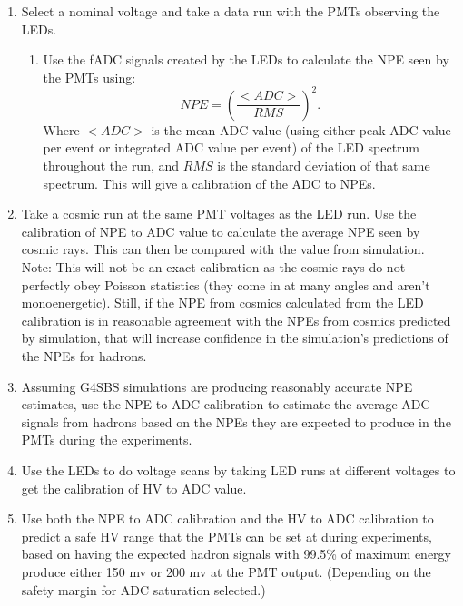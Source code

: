 \documentclass[10pt]{article}
\begin{document}
\begin{enumerate}
	\item Select a nominal voltage and take a data run with the PMTs observing the LEDs.
		\begin{enumerate}
			\item Use the fADC signals created by the LEDs to calculate the NPE seen by the PMTs using:
			\begin{equation}
				NPE = \left( \frac{<ADC>}{RMS} \right)^2.
			\end{equation}
			Where $<ADC>$ is the mean ADC value (using either peak ADC value per event or integrated ADC value per event) of the LED spectrum throughout the run, and $RMS$ is the standard deviation of that same spectrum. This will give a calibration of the ADC to NPEs.
		\end{enumerate}
		\item Take a cosmic run at the same PMT voltages as the LED run. Use the calibration of NPE to ADC value to calculate the average NPE seen by cosmic rays. This can then be compared with the value from simulation. Note: This will not be an exact calibration as the cosmic rays do not perfectly obey Poisson statistics (they come in at many angles and aren't monoenergetic). Still, if the NPE from cosmics calculated from the LED calibration is in reasonable agreement with the NPEs from cosmics predicted by simulation, that will increase confidence in the simulation's predictions of the NPEs for hadrons.
		\item Assuming G4SBS simulations are producing reasonably accurate NPE estimates, use the NPE to ADC calibration to estimate the average ADC signals from hadrons based on the NPEs they are expected to produce in the PMTs during the experiments.
		\item Use the LEDs to do voltage scans by taking LED runs at different voltages to get the calibration of HV to ADC value.
		\item Use both the NPE to ADC calibration and the HV to ADC calibration to predict a safe HV range that the PMTs can be set at during experiments, based on having the expected hadron signals with 99.5\% of maximum energy produce either 150 mv or 200 mv at the PMT output. (Depending on the safety margin for ADC saturation selected.)
\end{enumerate}
\end{document}
